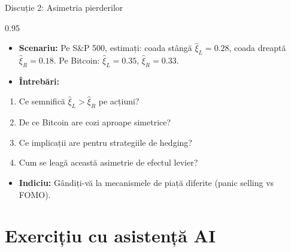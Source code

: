 \documentclass[9pt, aspectratio=169, t]{beamer}
\begin{document}
\begin{frame}{Discuție 2: Asimetria pierderilor}
    \begin{cminipage}{0.95\textwidth}
    \begin{itemize}\setlength{\itemsep}{0pt}
        \item \textbf{Scenariu:} Pe S\&P 500, estimați: coada stângă $\hat{\xi}_L = 0.28$, coada dreaptă $\hat{\xi}_R = 0.18$. Pe Bitcoin: $\hat{\xi}_L = 0.35$, $\hat{\xi}_R = 0.33$.
    \end{itemize}

    \vspace{0.3cm}
    \begin{itemize}\setlength{\itemsep}{0pt}
        \item \textbf{Întrebări:}
    \end{itemize}
    \begin{enumerate}\setlength{\itemsep}{0pt}
        \item Ce semnifică $\hat{\xi}_L > \hat{\xi}_R$ pe acțiuni?
        \item De ce Bitcoin are cozi aproape simetrice?
        \item Ce implicații are pentru strategiile de hedging?
        \item Cum se leagă această asimetrie de efectul levier?
    \end{enumerate}

    \vspace{0.3cm}
    \begin{itemize}\setlength{\itemsep}{0pt}
        \item \textbf{Indiciu:} Gândiți-vă la mecanismele de piață diferite (panic selling vs FOMO).
    \end{itemize}
    \end{cminipage}
\end{frame}

\section{Exercițiu cu asistență AI}
\end{document}
